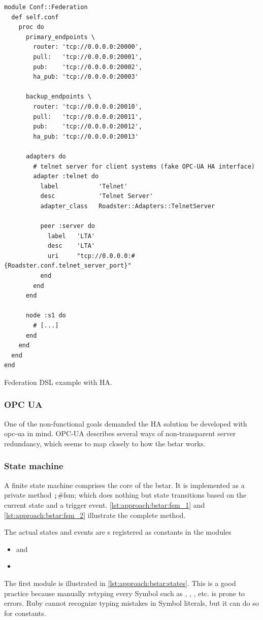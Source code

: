 \begin{listing}
	\begin{verbatim}
module Conf::Federation
  def self.conf
    proc do
      primary_endpoints \
        router: 'tcp://0.0.0.0:20000',
        pull:   'tcp://0.0.0.0:20001',
        pub:    'tcp://0.0.0.0:20002',
        ha_pub: 'tcp://0.0.0.0:20003'

      backup_endpoints \
        router: 'tcp://0.0.0.0:20010',
        pull:   'tcp://0.0.0.0:20011',
        pub:    'tcp://0.0.0.0:20012',
        ha_pub: 'tcp://0.0.0.0:20013'

      adapters do
        # telnet server for client systems (fake OPC-UA HA interface)
        adapter :telnet do
          label           'Telnet'
          desc            'Telnet Server'
          adapter_class   Roadster::Adapters::TelnetServer

          peer :server do
            label   'LTA'
            desc    'LTA'
            uri     "tcp://0.0.0.0:#{Roadster.conf.telnet_server_port}"
          end
        end
      end

      node :s1 do
        # [...]
      end
    end
  end
end
	\end{verbatim}
	\caption{Federation DSL example with HA.}
	\label{lst:dsl:topo:with-ha}
\end{listing}



\subsubsection{OPC UA}
One of the non-functional goals demanded the HA solution be developed with
\gls{opc-ua} in mind. OPC-UA describes several ways of non-transparent server
redundancy, which seems to map closely to how the \gls{bstar} works.

\subsubsection{State machine}
A finite state machine comprises the core of the \gls{bstar}. It is implemented
as a private method \texttt;#fsm; which does nothing but
state transitions based on the current state and a trigger event.
\autoref{lst:approach:bstar:fsm_1} and \autoref{lst:approach:bstar:fsm_2}
illustrate the complete method.

The actual states and events are s registered as
constants in the modules
\begin{itemize}
	\item {} and
	\item {}
\end{itemize}
The first module is illustrated in \autoref{lst:approach:bstar:states}.
This is a good practice because manually
retyping every Symbol such as \rb{:active}, \rb{:passive}, ,
etc. is prone to errors. Ruby cannot recognize typing mistakes in Symbol
literals, but it can do so for constants.

